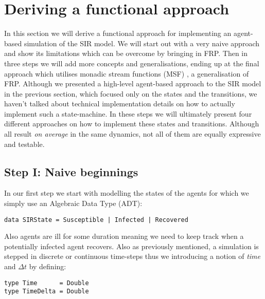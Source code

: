 \section{Deriving a functional approach}

In this section we will derive a functional approach for implementing an agent-based simulation of the SIR model. We will start out with a very naive approach and show its limitations which can be overcome by bringing in FRP. Then in three steps we will add more concepts and generalisations, ending up at the final approach which utilises monadic stream functions (MSF) \cite{perez_functional_2016}, a generalisation of FRP.
Although we presented a high-level agent-based approach to the SIR model in the previous section, which focused only on the states and the transitions, we haven't talked about technical implementation details on how to actually implement such a state-machine. In these steps we will ultimately present four different approaches on how to implement these states and transitions. Although all result \textit{on average} in the same dynamics, not all of them are equally expressive and testable.

\subsection*{Step I: Naive beginnings}
In our first step we start with modelling the states of the agents for which we simply use an Algebraic Data Type (ADT):

\begin{verbatim}
data SIRState = Susceptible | Infected | Recovered
\end{verbatim}

Also agents are ill for some duration meaning we need to keep track when a potentially infected agent recovers. Also as previously mentioned, a simulation is stepped in discrete or continuous time-steps thus we introducing a notion of \textit{time} and $\Delta t$ by defining:

\begin{verbatim}
type Time      = Double
type TimeDelta = Double
\end{verbatim}

